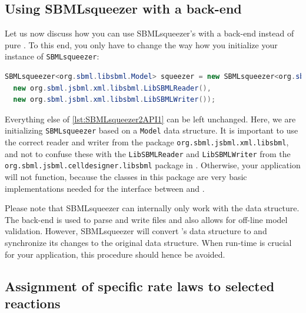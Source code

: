 \subsection{Using SBMLsqueezer with a \libSBML back-end}


Let us now discuss how you can use SBMLsqueezer's \API with a \libSBML back-end instead of pure \JSBML.
To this end, you only have to change the way how you initialize your instance of \texttt{SBMLsqueezer}:
\begin{lstlisting}[language=Java, numbers=none, caption={Initializing SBMLsqueezer 2 with a \libSBML back-end}]
SBMLsqueezer<org.sbml.libsbml.Model> squeezer = new SBMLsqueezer<org.sbml.libsbml.Model>(
  new org.sbml.jsbml.xml.libsbml.LibSBMLReader(),
  new org.sbml.jsbml.xml.libsbml.LibSBMLWriter());
\end{lstlisting}
Everything else of \cref{lst:SBMLsqueezer2API1} can be left unchanged.
Here, we are initializing \texttt{SBMLsqueezer} based on a \libSBML \texttt{Model} data structure.
It is important to use the correct reader and writer from the package \texttt{org.sbml.jsbml.xml.libsbml}, and not to confuse these with the \texttt{LibSBMLReader} and \texttt{LibSBMLWriter} from the \texttt{org.sbml.jsbml.celldesigner.libsbml} package in \JSBML.
Otherwise, your application will not function, because the classes in this package are very basic implementations needed for the interface between \JSBML and \CellDesigner.

Please note that SBMLsqueezer can internally only work with the \JSBML data structure.
The \libSBML back-end is used to parse and write \SBML files and also allows for off-line model validation.
However, SBMLsqueezer will convert \libSBML's data structure to \JSBML and synchronize its changes to the original data structure.
When run-time is crucial for your application, this procedure should hence be avoided.

\subsection{Assignment of specific rate laws to selected reactions}

